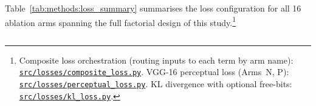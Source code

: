 \documentclass[12pt, a4paper, twoside, openright]{book}
\begin{document}
Table~\ref{tab:methods:loss_summary} summarises the loss configuration for all 16 ablation arms spanning the full factorial design of this study.\footnote{Composite loss orchestration (routing inputs to each term by arm name): \href{https://github.com/teklesam/ppva_hformer_codebase/blob/main/src/losses/composite_loss.py}{\texttt{src/losses/composite\_loss.py}}. VGG-16 perceptual loss (Arms~N, P): \href{https://github.com/teklesam/ppva_hformer_codebase/blob/main/src/losses/perceptual_loss.py}{\texttt{src/losses/perceptual\_loss.py}}. KL divergence with optional free-bits: \href{https://github.com/teklesam/ppva_hformer_codebase/blob/main/src/losses/kl_loss.py}{\texttt{src/losses/kl\_loss.py}}.}

\begin{landscape}
\singlespacing
\small
\setlength{\LTcapwidth}{\linewidth}
\begin{longtable}{lcccccccccc}


\end{longtable}
\end{landscape}
\end{document}
